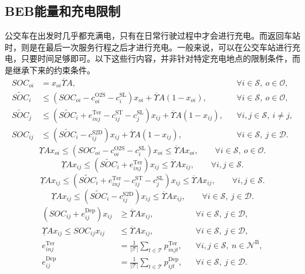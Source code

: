 \documentclass{article}
\begin{document}
\subsection*{BEB能量和充电限制}
公交车在出发时几乎都充满电，只有在日常行驶过程中才会进行充电。而返回车站时，则是在最后一次服务行程之后才进行充电。一般来说，可以在公交车站进行充电，只要时间足够即可。以下这些行内容，并非针对特定充电地点的限制条件，而是继承下来的约束条件。
\begin{align}
SOC_{oi}&=x_{oi}\overline\Upsilon A,
&&\forall i\in\mathcal S,\ o\in\mathcal O,\tag{10}\\
\widetilde{SOC}_i&\leq
(SOC_{oi}-c^{\mathrm{O2S}}_{oi}-c^{\mathrm{SL}}_i)x_{oi}
+\overline\Upsilon A(1-x_{oi}),
&&\forall i\in\mathcal S,\ o\in\mathcal O,\tag{11}\\
\widetilde{SOC}_j&\leq
(\widetilde{SOC}_i+e^{\mathrm{Ter}}_{inj}-c^{\mathrm{ST}}_{ij}-c^{\mathrm{SL}}_j)x_{ij}
+\overline\Upsilon A(1-x_{ij}),
&&\forall i,j\in\mathcal S,\ i\ne j,\tag{12}\\
SOC_{ij}&\leq
(\widetilde{SOC}_i-c^{\mathrm{S2D}}_{ij})x_{ij}
+\overline\Upsilon A(1-x_{ij}),
&&\forall i\in\mathcal S,\ j\in\mathcal D.\tag{13}
\end{align}
\begin{equation}
\underline\Upsilon Ax_{oi}\leq
(SOC_{oi}-c^{\mathrm{O2S}}_{oi}-c^{\mathrm{SL}}_i)x_{oi}
\leq\overline\Upsilon Ax_{oi},
\qquad\forall i\in\mathcal S,\ o\in\mathcal O.
\tag{14}
\end{equation}
\begin{equation}
\underline\Upsilon Ax_{ij}\leq
(\widetilde{SOC}_i+e^{\mathrm{Ter}}_{inj})x_{ij}
\leq\overline\Upsilon Ax_{ij},
\qquad\forall i,j\in\mathcal S.
\tag{15}
\end{equation}
\begin{equation}
\underline\Upsilon Ax_{ij}\leq
(\widetilde{SOC}_i+e^{\mathrm{Ter}}_{inj}-c^{\mathrm{ST}}_{ij}-c^{\mathrm{SL}}_j)x_{ij}
\leq\overline\Upsilon Ax_{ij},
\qquad\forall i,j\in\mathcal S.
\tag{16}
\end{equation}
\begin{equation}
\underline\Upsilon Ax_{ij}\leq
(\widetilde{SOC}_i-c^{\mathrm{S2D}}_{ij})x_{ij}
\leq\overline\Upsilon Ax_{ij},
\qquad\forall i\in\mathcal S,\ j\in\mathcal D.
\tag{17}
\end{equation}
\begin{align}
(SOC_{ij}+e^{\mathrm{Dep}}_{ij})x_{ij}&\geq\overline\Upsilon Ax_{ij},
&&\forall i\in\mathcal S,\ j\in\mathcal D,\tag{18}\\
\underline\Upsilon Ax_{ij}\leq SOC_{ij}x_{ij}&\leq\overline\Upsilon Ax_{ij},
&&\forall i\in\mathcal S,\ j\in\mathcal D,\tag{19}\\
e^{\mathrm{Ter}}_{inj}&=\frac{1}{|\mathcal T|}\sum_{t\in\mathcal T}p^{\mathrm{Ter}}_{injt},
&&\forall i,j\in\mathcal S,\ n\in\mathcal N^{\mathrm B},\tag{20}\\
e^{\mathrm{Dep}}_{ij}&=\frac{1}{|\mathcal T|}\sum_{t\in\mathcal T}p^{\mathrm{Dep}}_{ijt},
&&\forall i\in\mathcal S,\ j\in\mathcal D.\tag{21}
\end{align}
\end{document}

